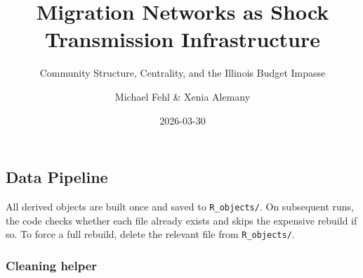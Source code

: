 \documentclass[
  11pt,
  letterpaper,
  DIV=11,
  numbers=noendperiod]{scrartcl}
\title{Migration Networks as Shock Transmission Infrastructure}
\subtitle{Community Structure, Centrality, and the Illinois Budget
Impasse}
\author{Michael Fehl \& Xenia Alemany}
\date{2026-03-30}
\renewcommand*\contentsname{Table of contents}
\newcommand\contentsname{Table of contents}
\begin{document}
\maketitle

\renewcommand*\contentsname{Table of contents}
{
\hypersetup{linkcolor=}
\setcounter{tocdepth}{3}
\tableofcontents
}

\subsection{Data Pipeline}\label{data-pipeline}

All derived objects are built once and saved to \texttt{R\_objects/}. On
subsequent runs, the code checks whether each file already exists and
skips the expensive rebuild if so. To force a full rebuild, delete the
relevant file from \texttt{R\_objects/}.

\subsubsection{Cleaning helper}\label{cleaning-helper}
\end{document}
